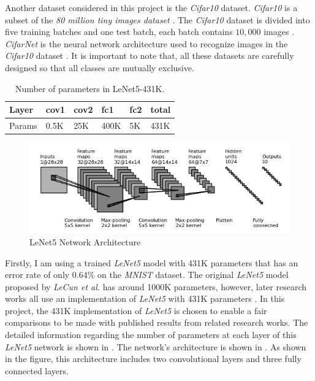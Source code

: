 \documentclass[a4paper,12pt]{report}
\begin{document}
Another dataset considered in this project is the \textit{Cifar10} dataset.
\textit{Cifar10} is a subset of the \textit{80 million tiny images dataset} \cite{torralba200880}.
The \textit{Cifar10} dataset is divided into five training batches and one test batch,
each batch contains $10,000$ images \cite{krizhevsky2014cifar}.
\textit{CifarNet} is the neural network architecture used to recognize images in the
\textit{Cifar10} dataset \cite{krizhevsky2009learning}.
It is important to note that, all these datasets are carefully designed so that
all classes are mutually exclusive.
\begin{table}[!h]
\centering
\begin{tabular}{|l|l|l|l|l|l|}
\hline
Layer			&cov1	&cov2	&fc1	&fc2 		&total\\ \hline
Params		& 0.5K		&25K	&400K	&5K		&431K\\
\hline
\end{tabular}
\caption{Number of parameters in LeNet5-431K.}
\label{tab:LeNetparam}
\end{table}

\begin{figure}[!h]
  \includegraphics[width=\textwidth]{fig_mnist.png}
  \caption{LeNet5 Network Architecture}
  \label{fig:lenet5_arch}
\end{figure}

Firstly, I am using a trained \textit{LeNet5} model with 431K parameters that
has an error rate of only $0.64\%$ on the \textit{MNIST} dataset.
The original \textit{LeNet5} model proposed by \textit{LeCun et al.} has around 1000K
parameters, however, later research works all use an implementation of \textit{LeNet5}
with 431K parameters \cite{jia2014caffe, Han15, Guo}.
In this project, the 431K implementation of \textit{LeNet5} is chosen to enable a
fair comparisons to be made with published results from related research works.
The detailed information regarding the number of parameters
at each layer of this \textit{LeNet5} network is shown in .
The network's architecture is shown in .
As shown in the figure, this architecture includes two convolutional layers and three fully connected
layers.
\end{document}
